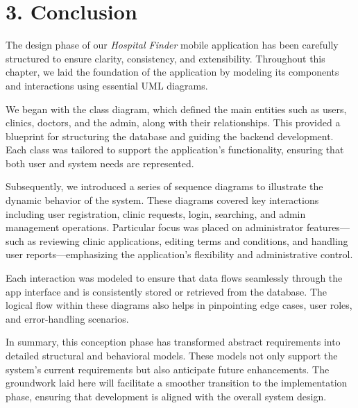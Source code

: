 \documentclass[12pt]{report}
\begin{document}
\section*{3. Conclusion}

\vspace{1em}

\noindent
The design phase of our \textit{Hospital Finder} mobile application has been carefully structured to ensure clarity, consistency, and extensibility. Throughout this chapter, we laid the foundation of the application by modeling its components and interactions using essential UML diagrams.
\vspace{1em}

\noindent
We began with the class diagram, which defined the main entities such as users, clinics, doctors, and the admin, along with their relationships. This provided a blueprint for structuring the database and guiding the backend development. Each class was tailored to support the application's functionality, ensuring that both user and system needs are represented.

\vspace{1em}

\noindent
Subsequently, we introduced a series of sequence diagrams to illustrate the dynamic behavior of the system. These diagrams covered key interactions including user registration, clinic requests, login, searching, and admin management operations. Particular focus was placed on administrator features—such as reviewing clinic applications, editing terms and conditions, and handling user reports—emphasizing the application's flexibility and administrative control.

\vspace{1em}

\noindent
Each interaction was modeled to ensure that data flows seamlessly through the app interface and is consistently stored or retrieved from the database. The logical flow within these diagrams also helps in pinpointing edge cases, user roles, and error-handling scenarios.

\vspace{1em}

\noindent
In summary, this conception phase has transformed abstract requirements into detailed structural and behavioral models. These models not only support the system’s current requirements but also anticipate future enhancements. The groundwork laid here will facilitate a smoother transition to the implementation phase, ensuring that development is aligned with the overall system design.
\end{document}
